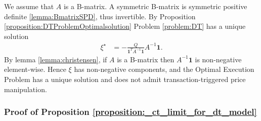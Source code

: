 \documentclass[final,3p,authoryear,12pt]{elsarticle}
\begin{document}
We assume that $A$ is a B-matrix. A symmetric B-matrix is symmetric positive definite \ref{lemma:BmatrixSPD}, thus invertible. By Proposition \ref{proposition:DTProblemOptimalsolution} Problem \ref{problem:DT} has a unique solution
\begin{eqnarray}
    \xi^{\star} &= -\frac{Q}{\pmb{1}^{T}A^{-1}\pmb{1}} A^{-1}\pmb{1}.
\end{eqnarray}
By lemma \ref{lemma:christensen}, if $A$ is a B-matrix then $A^{-1}\pmb{1}$ is non-negative element-wise. Hence $\xi$ has non-negative components, and the Optimal Execution Problem has a unique solution and does not admit transaction-triggered price manipulation. 


\subsubsection{Proof of Proposition \ref{proposition:_ct_limit_for_dt_model}}
\end{document}
